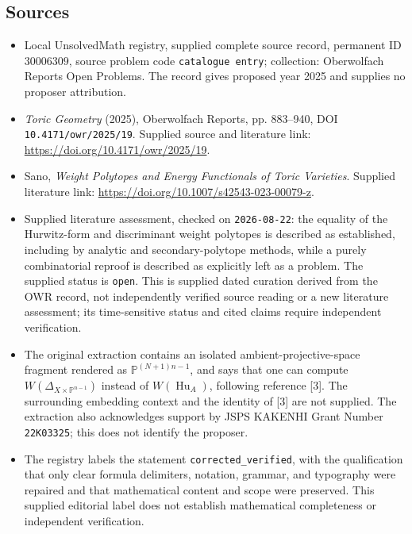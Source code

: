 \documentclass[11pt]{article}
\begin{document}
\subsection{Sources}
\begin{itemize}
\item Local UnsolvedMath registry, supplied complete source record, permanent ID \(30006309\), source problem code \texttt{catalogue entry}; collection: Oberwolfach Reports Open Problems. The record gives proposed year 2025 and supplies no proposer attribution.
\item \emph{Toric Geometry} (2025), Oberwolfach Reports, pp. 883--940, DOI \texttt{10.4171/owr/2025/19}. Supplied source and literature link: \url{https://doi.org/10.4171/owr/2025/19}.
\item Sano, \emph{Weight Polytopes and Energy Functionals of Toric Varieties}. Supplied literature link: \url{https://doi.org/10.1007/s42543-023-00079-z}.
\item Supplied literature assessment, checked on \texttt{2026-08-22}: the equality of the Hurwitz-form and discriminant weight polytopes is described as established, including by analytic and secondary-polytope methods, while a purely combinatorial reproof is described as explicitly left as a problem. The supplied status is \texttt{open}. This is supplied dated curation derived from the OWR record, not independently verified source reading or a new literature assessment; its time-sensitive status and cited claims require independent verification.
\item The original extraction contains an isolated ambient-projective-space fragment rendered as \(\mathbb P^{(N+1)n-1}\), and says that one can compute \(W(\Delta_{X\times\mathbb P^{n-1}})\) instead of \(W(\operatorname{Hu}_A)\), following reference [3]. The surrounding embedding context and the identity of [3] are not supplied. The extraction also acknowledges support by JSPS KAKENHI Grant Number \texttt{22K03325}; this does not identify the proposer.
\item The registry labels the statement \texttt{corrected\_verified}, with the qualification that only clear formula delimiters, notation, grammar, and typography were repaired and that mathematical content and scope were preserved. This supplied editorial label does not establish mathematical completeness or independent verification.
\end{itemize}
\end{document}
